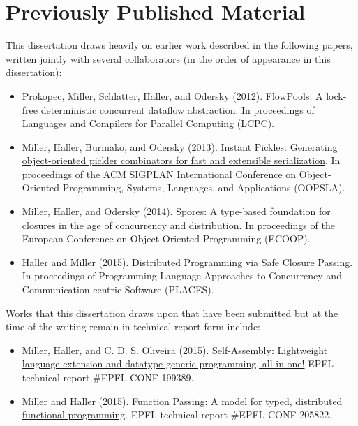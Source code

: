 \section{Previously Published Material}

This dissertation draws heavily on earlier work described in the following
papers, written jointly with several collaborators (in the order of appearance
in this dissertation):

\begin{itemize}

	\item Prokopec, Miller, Schlatter, Haller, and Odersky (2012).
	\href{http://infoscience.epfl.ch/record/180265}{FlowPools: A lock-free
	deterministic concurrent dataflow abstraction}. In proceedings of Languages and
	Compilers for Parallel Computing (LCPC).

	\item Miller, Haller, Burmako, and Odersky (2013).
	\href{http://infoscience.epfl.ch/record/188383}{Instant Pickles: Generating
	object-oriented pickler combinators for fast and extensible serialization}. In proceedings of the ACM SIGPLAN International Conference on Object-Oriented Programming, Systems, Languages, and Applications (OOPSLA).

	\item Miller, Haller, and Odersky (2014).
	\href{http://infoscience.epfl.ch/record/191239}{Spores: A type-based
	foundation for closures in the age of concurrency and distribution}. In
	proceedings of the European Conference on Object-Oriented Programming (ECOOP).

	\item Haller and Miller (2015).
	\href{https://infoscience.epfl.ch/record/205039}{Distributed Programming
	via Safe Closure Passing}. In proceedings of Programming Language Approaches to
	Concurrency and Communication-centric Software (PLACES).

\end{itemize}

Works that this dissertation draws upon that have been submitted but at the time
of the writing remain in technical report form include:

\begin{itemize}

	\item Miller, Haller, and C. D. S. Oliveira (2015). \href{http://infoscience.epfl.ch/record/199389}{Self-Assembly: Lightweight language extension and datatype generic programming, all-in-one!} EPFL technical report \#EPFL-CONF-199389.

	\item Miller and Haller (2015).
	\href{http://infoscience.epfl.ch/record/205822}{Function Passing: A model for
	typed, distributed functional programming}. EPFL technical report
	\#EPFL-CONF-205822.

\end{itemize}
